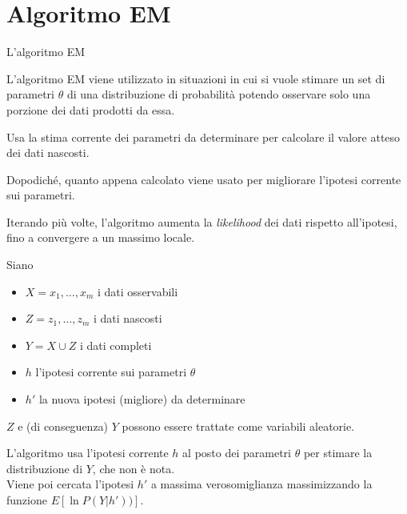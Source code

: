 \documentclass[hyperref={pdfpagelabels=false},slidestop,mathserif,red]{beamer}
\title[Elaborato di Apprendimento Automatico] %
{}
\subtitle
{Accelerometer Based Gesture Recognition using HMMs} %
\author[Andrea~Tarocchi, Marco~Magnatti] %
{Andrea~Tarocchi, Marco~Magnatti}
\date[Exam] %
{8 gennaio 2009}
\begin{document}
\section{Algoritmo EM}

\begin{frame}{L'algoritmo EM}{}

\begin{block}{}
L'algoritmo EM viene utilizzato in situazioni in cui si vuole stimare un set di parametri $\theta$ di una distribuzione di probabilit\`a potendo osservare solo una porzione dei dati prodotti da essa.
\end{block}

\begin{block}{}
 Usa la stima corrente dei parametri da determinare per calcolare il valore atteso dei dati nascosti.
\end{block}

\begin{block}{}
 Dopodich\'e, quanto appena calcolato viene usato per migliorare l'ipotesi corrente sui parametri.
\end{block}

\begin{block}{}
 Iterando pi\`u volte, l'algoritmo aumenta la \textit{likelihood} dei dati rispetto all'ipotesi, fino a convergere a un massimo locale.
\end{block}

\end{frame}

\begin{frame}{}

\begin{block}{}
 Siano
  \begin{itemize}
   \item $X = {x_{1}, \ldots, x_{m}}$ i dati osservabili
   \item $Z = {z_{1}, \ldots, z_{m}}$ i dati nascosti
   \item $Y = X \cup Z$ i dati completi
   \item $h$ l'ipotesi corrente sui parametri $\theta$
   \item $h'$ la nuova ipotesi (migliore) da determinare
  \end{itemize}
\end{block}

\begin{block}{}
 $Z$ e (di conseguenza) $Y$ possono essere trattate come variabili aleatorie.
\end{block}

\begin{block}{}
 L'algoritmo usa l'ipotesi corrente $h$ al posto dei parametri $\theta$ per stimare la distribuzione di $Y$, che non \`e nota.\\
 Viene poi cercata l'ipotesi $h'$ a massima verosomiglianza massimizzando la funzione $E[\ln P(Y | h'))]$.
\end{block}

\end{frame}
\end{document}
